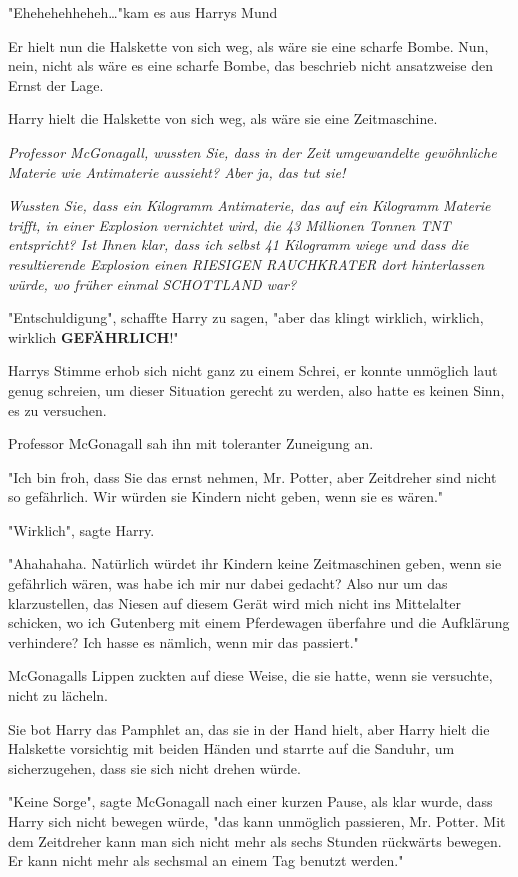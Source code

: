 {"Ehehehehheheh…"kam es aus Harrys Mund

Er hielt nun die Halskette von sich weg, als wäre sie eine scharfe Bombe. Nun, nein, nicht als wäre es eine scharfe Bombe, das beschrieb nicht ansatzweise den Ernst der Lage.

Harry hielt die Halskette von sich weg, als wäre sie eine Zeitmaschine.

\emph{Professor McGonagall, wussten Sie, dass in der Zeit umgewandelte gewöhnliche Materie wie Antimaterie aussieht? Aber ja, das tut sie!}

\emph{Wussten Sie, dass ein Kilogramm Antimaterie, das auf ein Kilogramm Materie trifft, in einer Explosion vernichtet wird, die 43 Millionen Tonnen TNT entspricht? Ist Ihnen klar, dass ich selbst 41 Kilogramm wiege und dass die resultierende Explosion einen RIESIGEN RAUCHKRATER dort hinterlassen würde, wo früher einmal SCHOTTLAND war?}

"Entschuldigung", schaffte Harry zu sagen, "aber das klingt wirklich, wirklich, wirklich \textbf{GEFÄHRLICH}!"

Harrys Stimme erhob sich nicht ganz zu einem Schrei, er konnte unmöglich laut genug schreien, um dieser Situation gerecht zu werden, also hatte es keinen Sinn, es zu versuchen.

Professor McGonagall sah ihn mit toleranter Zuneigung an.

"Ich bin froh, dass Sie das ernst nehmen, Mr. Potter, aber Zeitdreher sind nicht so gefährlich. Wir würden sie Kindern nicht geben, wenn sie es wären."

"Wirklich", sagte Harry.

"Ahahahaha. Natürlich würdet ihr Kindern keine Zeitmaschinen geben, wenn sie gefährlich wären, was habe ich mir nur dabei gedacht? Also nur um das klarzustellen, das Niesen auf diesem Gerät wird mich nicht ins Mittelalter schicken, wo ich Gutenberg mit einem Pferdewagen überfahre und die Aufklärung verhindere? Ich hasse es nämlich, wenn mir das passiert."

McGonagalls Lippen zuckten auf diese Weise, die sie hatte, wenn sie versuchte, nicht zu lächeln.

Sie bot Harry das Pamphlet an, das sie in der Hand hielt, aber Harry hielt die Halskette vorsichtig mit beiden Händen und starrte auf die Sanduhr, um sicherzugehen, dass sie sich nicht drehen würde.

"Keine Sorge", sagte McGonagall nach einer kurzen Pause, als klar wurde, dass Harry sich nicht bewegen würde, "das kann unmöglich passieren, Mr. Potter. Mit dem Zeitdreher kann man sich nicht mehr als sechs Stunden rückwärts bewegen. Er kann nicht mehr als sechsmal an einem Tag benutzt werden."

}
